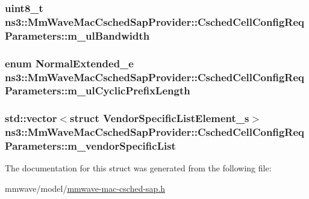 \subsubsection[{\texorpdfstring{m\+\_\+ul\+Bandwidth}{m_ulBandwidth}}]{\setlength{\rightskip}{0pt plus 5cm}uint8\+\_\+t ns3\+::\+Mm\+Wave\+Mac\+Csched\+Sap\+Provider\+::\+Csched\+Cell\+Config\+Req\+Parameters\+::m\+\_\+ul\+Bandwidth}\hypertarget{structns3_1_1MmWaveMacCschedSapProvider_1_1CschedCellConfigReqParameters_a3122d435e43332028365f8d44f0f9309}{}\label{structns3_1_1MmWaveMacCschedSapProvider_1_1CschedCellConfigReqParameters_a3122d435e43332028365f8d44f0f9309}
\subsubsection[{\texorpdfstring{m\+\_\+ul\+Cyclic\+Prefix\+Length}{m_ulCyclicPrefixLength}}]{\setlength{\rightskip}{0pt plus 5cm}enum {\bf Normal\+Extended\+\_\+e} ns3\+::\+Mm\+Wave\+Mac\+Csched\+Sap\+Provider\+::\+Csched\+Cell\+Config\+Req\+Parameters\+::m\+\_\+ul\+Cyclic\+Prefix\+Length}\hypertarget{structns3_1_1MmWaveMacCschedSapProvider_1_1CschedCellConfigReqParameters_a529c8fd04e9d0b31a827d49db745c4c6}{}\label{structns3_1_1MmWaveMacCschedSapProvider_1_1CschedCellConfigReqParameters_a529c8fd04e9d0b31a827d49db745c4c6}
\subsubsection[{\texorpdfstring{m\+\_\+vendor\+Specific\+List}{m_vendorSpecificList}}]{\setlength{\rightskip}{0pt plus 5cm}std\+::vector$<$struct {\bf Vendor\+Specific\+List\+Element\+\_\+s}$>$ ns3\+::\+Mm\+Wave\+Mac\+Csched\+Sap\+Provider\+::\+Csched\+Cell\+Config\+Req\+Parameters\+::m\+\_\+vendor\+Specific\+List}\hypertarget{structns3_1_1MmWaveMacCschedSapProvider_1_1CschedCellConfigReqParameters_a2173f23a7ae1d9066bec3da84326bc6b}{}\label{structns3_1_1MmWaveMacCschedSapProvider_1_1CschedCellConfigReqParameters_a2173f23a7ae1d9066bec3da84326bc6b}


The documentation for this struct was generated from the following file\+:\begin{DoxyCompactItemize}
\item 
mmwave/model/\hyperlink{mmwave-mac-csched-sap_8h}{mmwave-\/mac-\/csched-\/sap.\+h}\end{DoxyCompactItemize}
